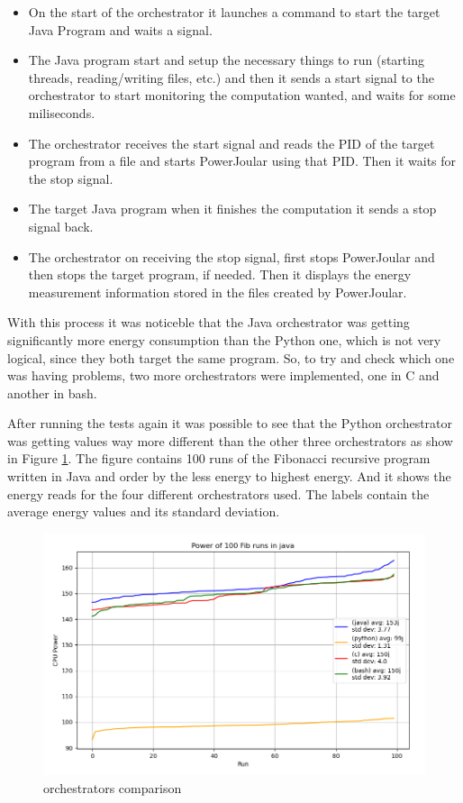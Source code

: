 \documentclass[sigplan]{acmart}
\begin{document}
\begin{itemize}
  \item On the start of the orchestrator it launches a command to start the target Java Program and waits a signal.
  \item The Java program start and setup the necessary things to run (starting threads, reading/writing files, etc.) and then it sends a start signal to the orchestrator to start monitoring the computation wanted, and waits for some miliseconds. 
  \item The orchestrator receives the start signal and reads the PID of the target program from a file and starts PowerJoular using that PID. Then it waits for the stop signal.
  \item The target Java program when it finishes the computation it sends a stop signal back.
  \item The orchestrator on receiving the stop signal, first stops PowerJoular and then stops the target program, if needed. Then it displays the energy measurement information stored in the files created by PowerJoular. \\
\end{itemize}

With this process it was noticeble that the Java orchestrator was getting significantly more energy consumption than the Python one, which is not very logical, since they both target the same program. So, to try and check which one was having problems, two more orchestrators were implemented, one in C and another in bash.

After running the tests again it was possible to see that the Python orchestrator was getting values way more different than the other three orchestrators as show in Figure \ref{fig:4_orchs_comparison}.
The figure contains 100 runs of the Fibonacci recursive program written in Java and order by the less energy to highest energy. And it shows the energy reads for the four different orchestrators used. The labels contain the average energy values and its standard deviation.

\begin{figure}%
  \centering
  \includegraphics[width = 0.5 \textwidth]{figures/4_orchestrators_comparison.png}
  \caption{orchestrators comparison}
  \label{fig:4_orchs_comparison}
\end{figure}
\end{document}
